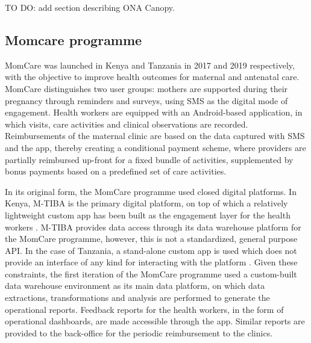 \documentclass[
  authoryear]{elsarticle}
\begin{document}
TO DO: add section describing ONA Canopy.

\subsection{Momcare programme}\label{momcare-programme}

MomCare was launched in Kenya
\citep{huisman2022digital, sanctis2022maintaining} and Tanzania
\citep{shija2021access, mrema2021application} in 2017 and 2019
respectively, with the objective to improve health outcomes for maternal
and antenatal care. MomCare distinguishes two user groups: mothers are
supported during their pregnancy through reminders and surveys, using
SMS as the digital mode of engagement. Health workers are equipped with
an Android-based application, in which visits, care activities and
clinical observations are recorded. Reimbursements of the maternal
clinic are based on the data captured with SMS and the app, thereby
creating a conditional payment scheme, where providers are partially
reimbursed up-front for a fixed bundle of activities, supplemented by
bonus payments based on a predefined set of care activities.

In its original form, the MomCare programme used closed digital
platforms. In Kenya, M-TIBA is the primary digital platform, on top of
which a relatively lightweight custom app has been built as the
engagement layer for the health workers \citep{huisman2022digital}.
M-TIBA provides data access through its data warehouse platform for the
MomCare programme, however, this is not a standardized, general purpose
API. In the case of Tanzania, a stand-alone custom app is used which
does not provide an interface of any kind for interacting with the
platform \citep{mrema2021application}. Given these constraints, the
first iteration of the MomCare programme used a custom-built data
warehouse environment as its main data platform, on which data
extractions, transformations and analysis are performed to generate the
operational reports. Feedback reports for the health workers, in the
form of operational dashboards, are made accessible through the app.
Similar reports are provided to the back-office for the periodic
reimbursement to the clinics.
\end{document}
